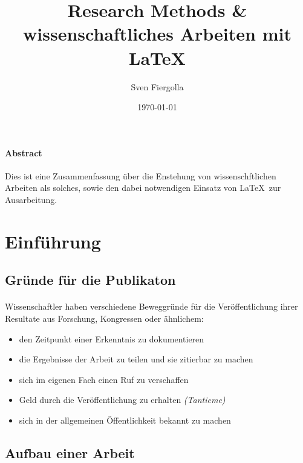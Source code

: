 \documentclass[12pt, a4paper]{article}
\author{Sven Fiergolla}
\title{Research
Methods \& wissenschaftliches Arbeiten mit \LaTeX}
\date{\today}
\begin{document}
 
\maketitle

\paragraph{Abstract}
Dies ist eine Zusammenfassung über die Enstehung von wissenschftlichen Arbeiten als solches, sowie den dabei notwendigen Einsatz von \LaTeX \ zur Ausarbeitung.\par
\tableofcontents

\section{Einführung}
\subsection{Gründe für die Publikaton}
\paragraph{}
Wissenschaftler haben verschiedene Beweggründe für die Veröffentlichung ihrer Resultate aus Forschung, Kongressen oder ähnlichem:
\begin{itemize}
\item den Zeitpunkt einer Erkenntnis zu dokumentieren
\item die Ergebnisse der Arbeit zu teilen und sie zitierbar zu machen
\item sich im eigenen Fach einen Ruf zu verschaffen
\item Geld durch die Veröffentlichung zu erhalten \textit{(Tantieme)}
\item sich in der allgemeinen Öffentlichkeit bekannt zu machen
\end{itemize}
\par

\subsection{Aufbau einer Arbeit}
\end{document}

